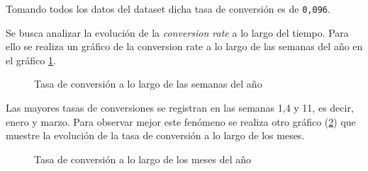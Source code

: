 \documentclass[a4paper]{article}
\begin{document}
Tomando todos los datos del dataset dicha tasa de conversión es de \texttt{0,096}. 
	
Se busca analizar la evolución de la \textit{conversion rate} a lo largo del tiempo. Para ello se realiza un gráfico de la conversion rate a lo largo de las semanas del año en el gráfico \ref{fig:conversionrate}.

\begin{figure}[!h]
	\caption{Tasa de conversión a lo largo de las semanas del año}
	\label{fig:conversionrate}
\end{figure}

Las mayores tasas de conversiones se registran en las semanas 1,4 y 11, es decir, enero y marzo. Para observar mejor este fenómeno se realiza otro gráfico (\ref{fig:conversionratemonthly}) que muestre la evolución de la tasa de conversión a lo largo de los meses. 

\begin{figure}[!h]
	\caption{Tasa de conversión a lo largo de los meses del año}
	\label{fig:conversionratemonthly}
\end{figure}
\end{document}

